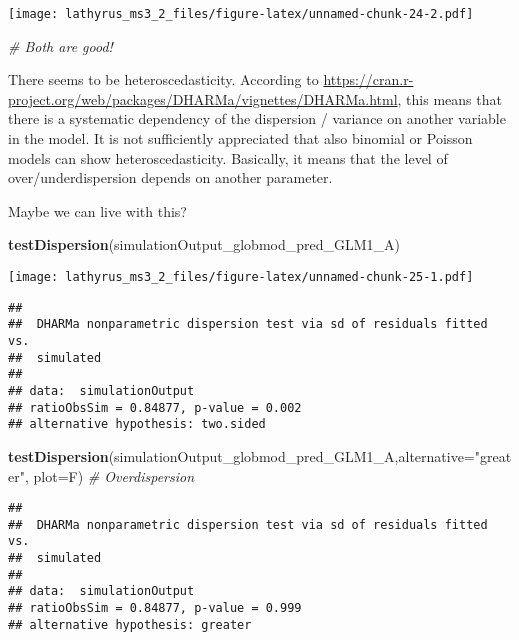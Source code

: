 \documentclass[
]{article}
\newenvironment{Shaded}{\begin{snugshade}}{\end{snugshade}}
\newcommand{\CommentTok}[1]{\textcolor[rgb]{0.56,0.35,0.01}{\textit{#1}}}
\newcommand{\DataTypeTok}[1]{\textcolor[rgb]{0.13,0.29,0.53}{#1}}
\newcommand{\KeywordTok}[1]{\textcolor[rgb]{0.13,0.29,0.53}{\textbf{#1}}}
\newcommand{\NormalTok}[1]{#1}
\newcommand{\StringTok}[1]{\textcolor[rgb]{0.31,0.60,0.02}{#1}}
\begin{document}
\texttt{[image: lathyrus\_ms3\_2\_files/figure-latex/unnamed-chunk-24-2.pdf]}

\begin{Shaded}
\begin{Highlighting}[]
\CommentTok{# Both are good!}
\end{Highlighting}
\end{Shaded}

There seems to be heteroscedasticity. According to
\url{https://cran.r-project.org/web/packages/DHARMa/vignettes/DHARMa.html},
this means that there is a systematic dependency of the dispersion /
variance on another variable in the model. It is not sufficiently
appreciated that also binomial or Poisson models can show
heteroscedasticity. Basically, it means that the level of
over/underdispersion depends on another parameter.

Maybe we can live with this?

\begin{Shaded}
\begin{Highlighting}[]
\KeywordTok{testDispersion}\NormalTok{(simulationOutput_globmod_pred_GLM1_A)}
\end{Highlighting}
\end{Shaded}

\texttt{[image: lathyrus\_ms3\_2\_files/figure-latex/unnamed-chunk-25-1.pdf]}

\begin{verbatim}
## 
##  DHARMa nonparametric dispersion test via sd of residuals fitted vs.
##  simulated
## 
## data:  simulationOutput
## ratioObsSim = 0.84877, p-value = 0.002
## alternative hypothesis: two.sided
\end{verbatim}

\begin{Shaded}
\begin{Highlighting}[]
\KeywordTok{testDispersion}\NormalTok{(simulationOutput_globmod_pred_GLM1_A,}\DataTypeTok{alternative=}\StringTok{"greater"}\NormalTok{,}
               \DataTypeTok{plot=}\NormalTok{F) }\CommentTok{# Overdispersion}
\end{Highlighting}
\end{Shaded}

\begin{verbatim}
## 
##  DHARMa nonparametric dispersion test via sd of residuals fitted vs.
##  simulated
## 
## data:  simulationOutput
## ratioObsSim = 0.84877, p-value = 0.999
## alternative hypothesis: greater
\end{verbatim}
\end{document}
